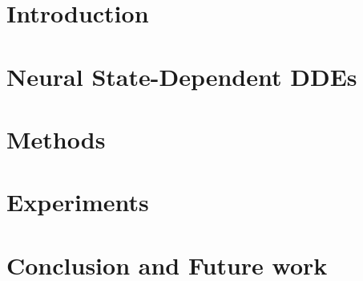\documentclass[final,5p,times,twocolumn,authoryear]{elsarticle}
\theoremstyle{plain}
\begin{document}


% 

% 

\section{Introduction}
\label{sec:intro}


\section{Neural State-Dependent DDEs}
\label{sec:dde}


\section{Methods}
\label{sec:methods}


\section{Experiments}
\label{sec:experiments}


\section{Conclusion and Future work} \label{sec:conclusions}


 


\appendix\label{sec:appendix}

\end{document}
